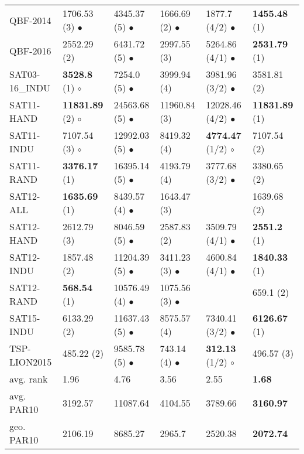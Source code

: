 \begin{tabular}{llllll}
QBF-2014 & 1706.53 (3) $\bullet$ & 4345.37 (5) $\bullet$ & 1666.69 (2) $\bullet$ & 1877.7 (4/2) $\bullet$ & \textbf{1455.48} (1) $\phantom{\bullet}$\\
QBF-2016 & 2552.29 (2) $\phantom{\bullet}$ & 6431.72 (5) $\bullet$ & 2997.55 (3) $\phantom{\bullet}$ & 5264.86 (4/1) $\bullet$ & \textbf{2531.79} (1) $\phantom{\bullet}$\\
SAT03-16\_INDU & \textbf{3528.8} (1) $\circ$ & 7254.0 (5) $\bullet$ & 3999.94 (4) $\phantom{\bullet}$ & 3981.96 (3/2) $\bullet$ & 3581.81 (2) $\phantom{\bullet}$\\
SAT11-HAND & \textbf{11831.89} (2) $\circ$ & 24563.68 (5) $\bullet$ & 11960.84 (3) $\phantom{\bullet}$ & 12028.46 (4/2) $\bullet$ & \textbf{11831.89} (1) $\phantom{\bullet}$\\
SAT11-INDU & 7107.54 (3) $\circ$ & 12992.03 (5) $\bullet$ & 8419.32 (4) $\phantom{\bullet}$ & \textbf{4774.47} (1/2) $\circ$ & 7107.54 (2) $\phantom{\bullet}$\\
SAT11-RAND & \textbf{3376.17} (1) $\phantom{\bullet}$ & 16395.14 (5) $\bullet$ & 4193.79 (4) $\phantom{\bullet}$ & 3777.68 (3/2) $\bullet$ & 3380.65 (2) $\phantom{\bullet}$\\
SAT12-ALL & \textbf{1635.69} (1) $\phantom{\bullet}$ & 8439.57 (4) $\bullet$ & 1643.47 (3) $\phantom{\bullet}$ &  & 1639.68 (2) $\phantom{\bullet}$\\
SAT12-HAND & 2612.79 (3) $\phantom{\bullet}$ & 8046.59 (5) $\bullet$ & 2587.83 (2) $\phantom{\bullet}$ & 3509.79 (4/1) $\bullet$ & \textbf{2551.2} (1) $\phantom{\bullet}$\\
SAT12-INDU & 1857.48 (2) $\phantom{\bullet}$ & 11204.39 (5) $\bullet$ & 3411.23 (3) $\bullet$ & 4600.84 (4/1) $\bullet$ & \textbf{1840.33} (1) $\phantom{\bullet}$\\
SAT12-RAND & \textbf{568.54} (1) $\phantom{\bullet}$ & 10576.49 (4) $\bullet$ & 1075.56 (3) $\bullet$ &  & 659.1 (2) $\phantom{\bullet}$\\
SAT15-INDU & 6133.29 (2) $\phantom{\bullet}$ & 11637.43 (5) $\bullet$ & 8575.57 (4) $\phantom{\bullet}$ & 7340.41 (3/2) $\bullet$ & \textbf{6126.67} (1) $\phantom{\bullet}$\\
TSP-LION2015 & 485.22 (2) $\phantom{\bullet}$ & 9585.78 (5) $\bullet$ & 743.14 (4) $\bullet$ & \textbf{312.13} (1/2) $\circ$ & 496.57 (3) $\phantom{\bullet}$\\
avg. rank & 1.96 & 4.76 & 3.56 & 2.55 & \textbf{1.68}\\
avg. PAR10 & 3192.57 & 11087.64 & 4104.55 & 3789.66 & \textbf{3160.97}\\
geo. PAR10 & 2106.19 & 8685.27 & 2965.7 & 2520.38 & \textbf{2072.74}\\
\end{tabular}